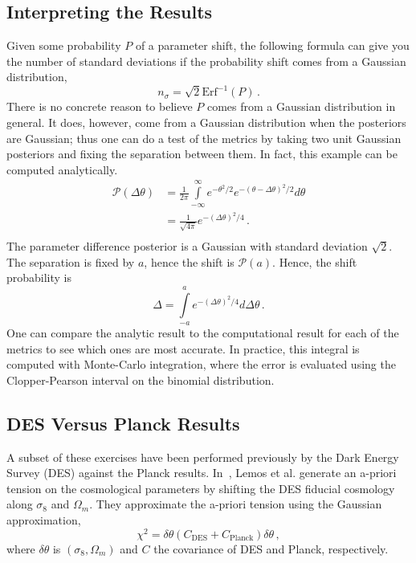 \subsection{Interpreting the Results}
Given some probability $P$ of a parameter shift, the following formula can give you the number of standard deviations if the probability shift comes from a Gaussian distribution,
\begin{equation}
	n_\sigma = \sqrt{2} \text{Erf}^{-1}(P)\,.
\end{equation}
There is no concrete reason to believe $P$ comes from a Gaussian distribution in general. It does, however, come from a Gaussian distribution when the posteriors are Gaussian; thus one can do a test of the metrics by taking two unit Gaussian posteriors and fixing the separation between them. In fact, this example can be computed analytically.
\begin{equation}
    \begin{split}
	\mathcal{P}(\Delta \theta) &= \frac{1}{2\pi} \int\limits_{-\infty}^{\infty} e^{-\theta^2/2} e^{-{(\theta-\Delta\theta)}^2/2}  d\theta \\
                               &= \frac{1}{\sqrt{4\pi}}e^{-{(\Delta\theta)}^2/4}\,.\\
    \end{split}
\end{equation}
The parameter difference posterior is a Gaussian with standard deviation $\sqrt{2}$. The separation is fixed by $a$, hence the shift is $\mathcal{P}(a)$. Hence, the shift probability is
\begin{equation}
	\Delta = \int\limits_{-a}^{a} e^{-{(\Delta\theta)}^2/4} d\Delta\theta\,.
\end{equation}
One can compare the analytic result to the computational result for each of the metrics to see which ones are most accurate. In practice, this integral is computed with Monte-Carlo integration, where the error is evaluated using the Clopper-Pearson interval on the binomial distribution.
\subsection{DES Versus Planck Results}
A subset of these exercises have been performed previously by the Dark Energy Survey (DES) against the Planck results. In~\cite{lemos_assessing_2021}, Lemos et al. generate an a-priori tension on the cosmological parameters by shifting the DES fiducial cosmology along $\sigma_8$ and $\Omega_m$. They approximate the a-priori tension using the Gaussian approximation,
\begin{equation}\label{eq:a-priori}
	\chi^2 = \delta\theta (C_\mathrm{DES}+C_\mathrm{Planck})\delta\theta\,,
\end{equation}
where $\delta\theta$ is $(\sigma_8,\Omega_m)$ and $C$ the covariance of DES and Planck, respectively.

